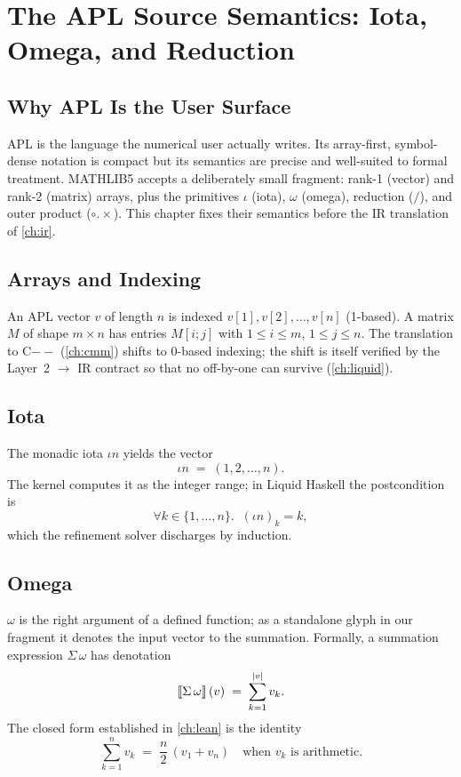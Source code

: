 \chapter{The APL Source Semantics: Iota, Omega, and Reduction}
\label{ch:apl-sem}

\section{Why APL Is the User Surface}
\label{sec:apl-why}

APL is the language the numerical user actually writes. Its array-first,
symbol-dense notation is compact but its semantics are precise and
well-suited to formal treatment. MATHLIB5 accepts a deliberately small
fragment: rank-1 (vector) and rank-2 (matrix) arrays, plus the primitives
$\iota$ (iota), $\omega$ (omega), reduction ($/$), and outer product
($\circ.\times$). This chapter fixes their semantics before the IR
translation of \cref{ch:ir}.

\section{Arrays and Indexing}
\label{sec:apl-array}

An APL vector $v$ of length $n$ is indexed $v[1], v[2], \dots, v[n]$
(1-based). A matrix $M$ of shape $m\times n$ has entries $M[i;j]$ with
$1\le i\le m$, $1\le j\le n$. The translation to C$--$ (\cref{ch:cmm})
shifts to 0-based indexing; the shift is itself verified by the Layer~2
$\to$ IR contract so that no off-by-one can survive (\cref{ch:liquid}).

\section{Iota}
\label{sec:apl-iota}

The monadic iota $\iota n$ yields the vector
\[
\iota n \;=\; (1, 2, \dots, n).
\]
The kernel computes it as the integer range; in Liquid Haskell the
postcondition is
\[
\forall k\in\{1,\dots,n\}.\;\; (\iota n)_k = k,
\]
which the refinement solver discharges by induction.

\section{Omega}
\label{sec:apl-omega}

$\omega$ is the right argument of a defined function; as a standalone
glyph in our fragment it denotes the input vector to the summation. Formally,
a summation expression $\Sigma\,\omega$ has denotation
\[
\left\llbracket \Sigma\,\omega \right\rrbracket(v) \;=\; \sum_{k=1}^{|v|} v_k.
\]
The closed form established in \cref{ch:lean} is the identity
\[
\sum_{k=1}^{n} v_k \;=\; \frac{n}{2}\,(v_1 + v_n)
\quad\text{when } v_k \text{ is arithmetic}.
\]

